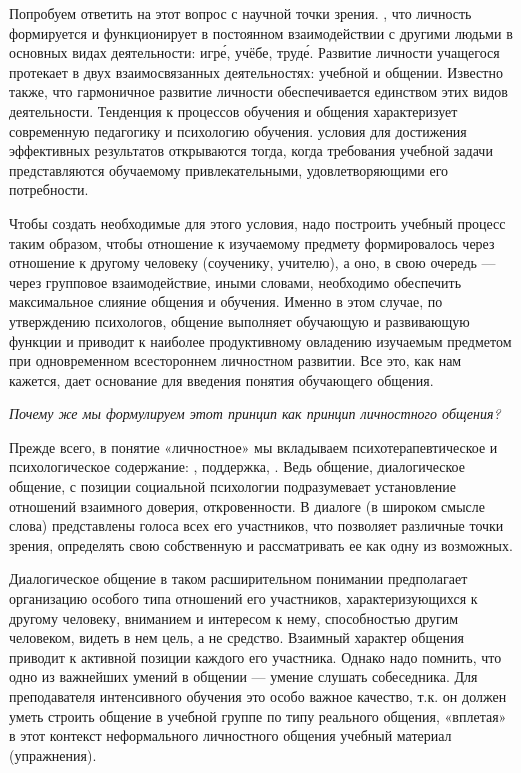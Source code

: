 Попробуем ответить на этот вопрос с научной точки зрения. , что личность формируется и функционирует в постоянном взаимодействии с другими людьми в основных видах деятельности: игр\'{е}, учёбе, труд\'{е}. Развитие личности учащегося протекает в двух взаимосвязанных деятельностях: учебной и общении. Известно также, что гармоничное развитие личности  обеспечивается единством этих видов деятельности. Тенденция к  процессов обучения и общения характеризует современную педагогику и психологию обучения.  условия для достижения эффективных результатов открываются тогда, когда требования учебной задачи представляются обучаемому привлекательными, удовлетворяющими его потребности.

Чтобы создать необходимые для этого условия, надо построить учебный процесс таким образом, чтобы отношение к изучаемому предмету формировалось через отношение к другому человеку (соученику, учителю), а оно, в свою очередь --- через групповое взаимодействие, иными словами, необходимо обеспечить максимальное слияние общения и обучения. Именно в этом случае, по утверждению психологов, общение выполняет обучающую и развивающую функции и приводит к наиболее продуктивному овладению изучаемым предметом при одновременном всестороннем личностном развитии. Все это, как нам кажется, дает основание для введения понятия обучающего общения.

\textit{Почему же мы формулируем этот принцип как принцип личностного общения?}

Прежде всего, в понятие «личностное» мы вкладываем психотерапевтическое и психологическое содержание: , поддержка, . Ведь общение, диалогическое общение, с позиции социальной психологии подразумевает установление отношений взаимного доверия, откровенности. В диалоге (в широком смысле слова) представлены голоса всех его участников, что позволяет  различные точки зрения, определять свою собственную и рассматривать ее как одну из возможных.

Диалогическое общение в таком расширительном понимании предполагает организацию особого типа отношений его участников, характеризующихся  к другому человеку, вниманием и интересом к нему, способностью  другим человеком, видеть в нем цель, а не средство. Взаимный характер общения приводит к активной позиции каждого его участника. Однако надо помнить, что одно из важнейших умений в общении --- умение слушать собеседника. Для преподавателя интенсивного обучения это особо важное качество, т.к. он должен уметь строить общение в учебной группе по типу реального общения, «вплетая» в этот контекст неформального личностного общения учебный материал (упражнения).

